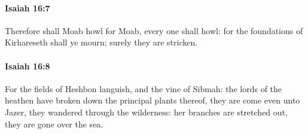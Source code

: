 		\paragraph{Isaiah 16:7} %
			\label{ISAIAH-16-7}

			Therefore shall Moab howl for Moab, every one shall howl: for the foundations of Kirhareseth shall ye mourn; surely they are stricken.


		\paragraph{Isaiah 16:8} %
			\label{ISAIAH-16-8}

			For the fields of Heshbon languish, and the vine of Sibmah: the lords of the heathen have broken down the principal plants thereof, they are come even unto Jazer, they wandered through the wilderness: her branches are stretched out, they are gone over the sea.


